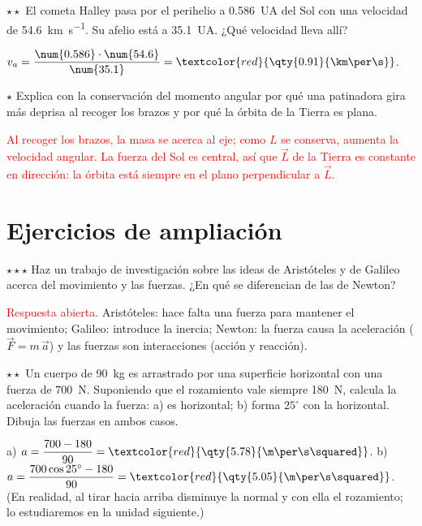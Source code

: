 \begin{exercise}
    \(\star\star\) El cometa Halley pasa por el perihelio a \qty{0.586}{UA} del Sol con una velocidad de \qty{54.6}{\km\per\s}. Su
    afelio está a \qty{35.1}{UA}. ¿Qué velocidad lleva allí?
    \begin{solu}
        \(v_a = \dfrac{\num{0.586} \cdot \num{54.6}}{\num{35.1}} = \textcolor{red}{\qty{0.91}{\km\per\s}}\).
    \end{solu}
\end{exercise}

\begin{exercise}
    \(\star\) Explica con la conservación del momento angular por qué una patinadora gira más deprisa al recoger los brazos y por qué
    la órbita de la Tierra es plana.
    \begin{solu}
        \textcolor{red}{Al recoger los brazos, la masa se acerca al eje; como \(L\) se conserva, aumenta la velocidad angular. La
        fuerza del Sol es central, así que \(\vec{L}\) de la Tierra es constante en dirección: la órbita está siempre en el plano
        perpendicular a \(\vec{L}\).}
    \end{solu}
\end{exercise}

\section{Ejercicios de ampliación}\label{sec:ud10-ampliacion}

\begin{exercise}
    \(\star\star\star\) Haz un trabajo de investigación sobre las ideas de Aristóteles y de Galileo acerca del movimiento y las
    fuerzas. ¿En qué se diferencian de las de Newton?
    \begin{solu}
        \textcolor{red}{Respuesta abierta.} Aristóteles: hace falta una fuerza para mantener el movimiento; Galileo: introduce la
        inercia; Newton: la fuerza causa la aceleración (\(\vec{F} = m\,\vec{a}\)) y las fuerzas son interacciones (acción y reacción).
    \end{solu}
\end{exercise}

\begin{exercise}
    \(\star\star\) Un cuerpo de \qty{90}{\kg} es arrastrado por una superficie horizontal con una fuerza de \qty{700}{\newton}.
    Suponiendo que el rozamiento vale siempre \qty{180}{\newton}, calcula la aceleración cuando la fuerza: a) es horizontal;
    b) forma \(25^\circ\) con la horizontal. Dibuja las fuerzas en ambos casos.
    \begin{solu}
        a) \(a = \dfrac{700 - 180}{90} = \textcolor{red}{\qty{5.78}{\m\per\s\squared}}\). b) \(a = \dfrac{700\cos 25^\circ - 180}{90} =
        \textcolor{red}{\qty{5.05}{\m\per\s\squared}}\). (En realidad, al tirar hacia arriba disminuye la normal y con ella el
        rozamiento; lo estudiaremos en la unidad siguiente.)
    \end{solu}
\end{exercise}


